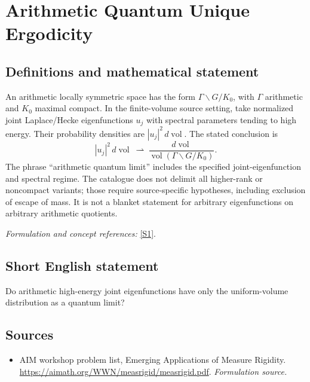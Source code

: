 \documentclass[11pt]{article}
\begin{document}
\section*{\texorpdfstring{Arithmetic Quantum Unique Ergodicity}{Arithmetic Quantum Unique Ergodicity}}\label{137}
\subsection{Definitions and mathematical statement}
An arithmetic locally symmetric space has the form $\Gamma\backslash G/K_0$, with $\Gamma$ arithmetic and $K_0$ maximal compact. In the finite-volume source setting, take normalized joint Laplace/Hecke eigenfunctions $u_j$ with spectral parameters tending to high energy. Their probability densities are $|u_j|^2\,d\operatorname{vol}$. The stated conclusion is
\[
 |u_j|^2\,d\operatorname{vol}\ \rightharpoonup\
 \frac{d\operatorname{vol}}{\operatorname{vol}(\Gamma\backslash G/K_0)}.
\]
The phrase ``arithmetic quantum limit'' includes the specified joint-eigenfunction and spectral regime. The catalogue does not delimit all higher-rank or noncompact variants; those require source-specific hypotheses, including exclusion of escape of mass. It is not a blanket statement for arbitrary eigenfunctions on arbitrary arithmetic quotients.
\par\smallskip\textit{Formulation and concept references:} \href{https://aimath.org/WWN/measrigid/measrigid.pdf}{[S1]}.

\subsection{Short English statement}
Do arithmetic high-energy joint eigenfunctions have only the uniform-volume distribution as a quantum limit?
\subsection{Sources}
\begin{itemize}
\item[S1]AIM workshop problem list, Emerging Applications of Measure Rigidity.
\url{https://aimath.org/WWN/measrigid/measrigid.pdf}.
\textit{Formulation source.}
\end{itemize}
\end{document}
